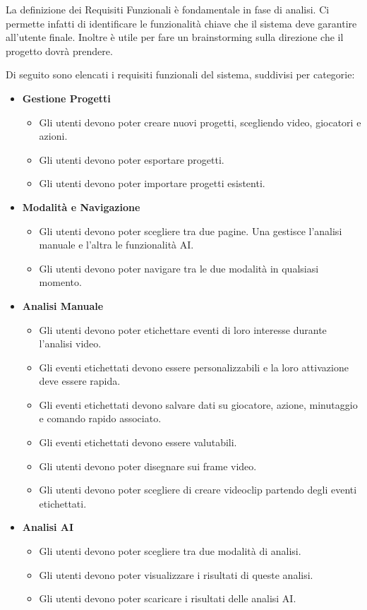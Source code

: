 La definizione dei Requisiti Funzionali è fondamentale in fase di analisi. Ci permette infatti di identificare le funzionalità chiave che il sistema deve garantire all'utente finale. Inoltre è utile per fare un brainstorming sulla direzione che il progetto dovrà prendere.

\noindent Di seguito sono elencati i requisiti funzionali del sistema, suddivisi per categorie:

\begin{itemize}
    \item \textbf{Gestione Progetti}
    \begin{itemize}
        \item Gli utenti devono poter creare nuovi progetti, scegliendo video, giocatori e azioni.
        \item Gli utenti devono poter esportare progetti.
        \item Gli utenti devono poter importare progetti esistenti.
    \end{itemize}

    \item \textbf{Modalità e Navigazione}
    \begin{itemize}
        \item Gli utenti devono poter scegliere tra due pagine. Una gestisce l'analisi manuale e l'altra le funzionalità AI.
        \item Gli utenti devono poter navigare tra le due modalità in qualsiasi momento.
    \end{itemize}

    \item \textbf{Analisi Manuale}
    \begin{itemize}
        \item Gli utenti devono poter etichettare eventi di loro interesse durante l'analisi video.
        \item Gli eventi etichettati devono essere personalizzabili e la loro attivazione deve essere rapida.
        \item Gli eventi etichettati devono salvare dati su giocatore, azione, minutaggio e comando rapido associato.
        \item Gli eventi etichettati devono essere valutabili.
        \item Gli utenti devono poter disegnare sui frame video.
        \item Gli utenti devono poter scegliere di creare videoclip partendo degli eventi etichettati.
    \end{itemize}

    \item \textbf{Analisi AI}
    \begin{itemize}
        \item Gli utenti devono poter scegliere tra due modalità di analisi.
        \item Gli utenti devono poter visualizzare i risultati di queste analisi.
        \item Gli utenti devono poter scaricare i risultati delle analisi AI.
    \end{itemize}
\end{itemize}


